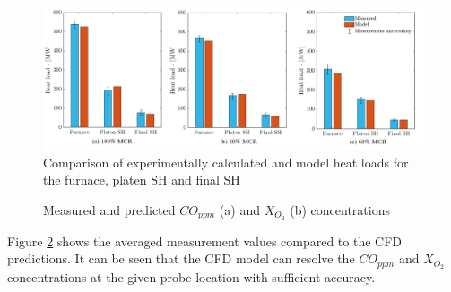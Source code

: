 \documentclass[twocolumn,10pt]{asme2ej}
\begin{document}
\begin{figure}[h]
\centerline{\includegraphics[scale = 0.4]{VALIDATION}}
\caption{Comparison of experimentally calculated and model heat loads for the furnace, platen SH and final SH}
\label{fig_heat_valid}
\end{figure}
\begin{figure}[h!]
\centering
{}
\hspace{5mm}
\caption{Measured and predicted $CO_{ppm}$ (a) and $X_{O_{2}}$ (b) concentrations}
\label{fig_probe_valid}
\end{figure}
Figure \ref{fig_probe_valid} shows the averaged measurement values compared to the CFD predictions. It can be seen that the CFD model can resolve the $CO_{ppm}$ and $X_{O_{2}}$ concentrations at the given probe location with sufficient accuracy.
\end{document}
